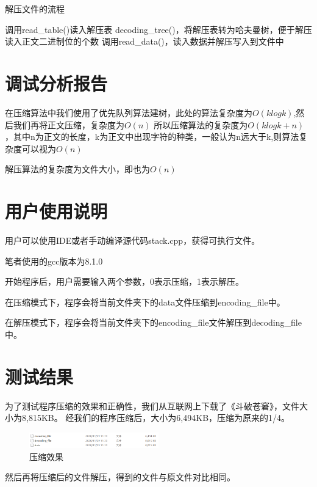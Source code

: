 \begin{algorithm}[htb] 
	\caption{ 解压文件的流程 } 
	\label{alg:Framwork} 
	\begin{algorithmic}[1]
	   \State 调用read\_table()读入解压表
	   \State decoding\_tree()，将解压表转为哈夫曼树，便于解压
	   \State 读入正文二进制位的个数
	   \State 调用read\_data()，读入数据并解压写入到文件中
	\end{algorithmic} 
\end{algorithm}

\newpage

\section{调试分析报告}

在压缩算法中我们使用了优先队列算法建树，此处的算法复杂度为$O(klogk)$,然后我们再将正文压缩，复杂度为$O(n)$
所以压缩算法的复杂度为$O(klogk + n)$，其中n为正文的长度，k为正文中出现字符的种类，一般认为n远大于k,则算法复杂度可以视为$O(n)$


解压算法的复杂度为文件大小，即也为$O(n)$

\section{用户使用说明}

用户可以使用IDE或者手动编译源代码stack.cpp，获得可执行文件。

笔者使用的gcc版本为8.1.0


开始程序后，用户需要输入两个参数，0表示压缩，1表示解压。

在压缩模式下，程序会将当前文件夹下的data文件压缩到encoding\_file中。

在解压模式下，程序会将当前文件夹下的encoding\_file文件解压到decoding\_file中。

\section{测试结果}
	为了测试程序压缩的效果和正确性，我们从互联网上下载了《斗破苍窘》，文件大小为8,815KB。
	经我们的程序压缩后，大小为6,494KB，压缩为原来的1/4。

	\begin{figure}[H]
		\centering
		\includegraphics[width=0.5\textwidth]{images/effect.png}
		\caption{压缩效果}
	\end{figure}

	然后再将压缩后的文件解压，得到的文件与原文件对比相同。
